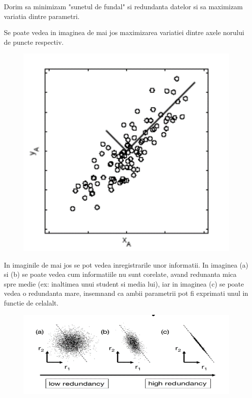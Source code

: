 \documentclass[12pt]{article}
\begin{document}
Dorim sa minimizam "sunetul de fundal" si redundanta datelor si sa maximizam variatia dintre parametri.

Se poate vedea in imaginea de mai jos maximizarea variatiei dintre axele norului de puncte respectiv.

\begin{figure}[H]
\centering
\includegraphics[scale=0.5]{Picture1}
\end{figure}

In imaginile de mai jos se pot vedea inregistrarile unor informatii. In imaginea (a) si (b) se poate vedea cum informatiile nu sunt corelate, avand redunanta mica spre medie (ex: inaltimea unui student si media lui), iar in imaginea (c) se poate vedea o redundanta mare, insemnand ca ambii parametrii pot fi exprimati unul in functie de celalalt.

\begin{figure}[H]
\centering
\includegraphics[width=\linewidth]{Picture2}
\end{figure}
\end{document}
